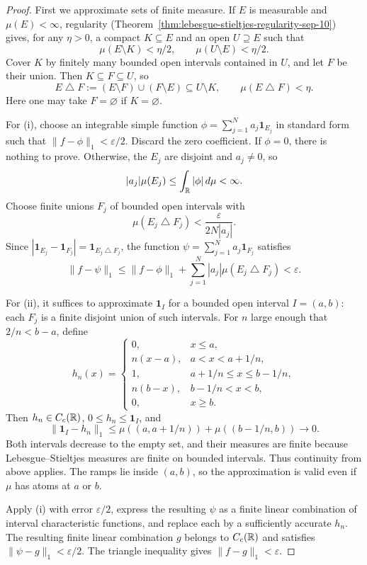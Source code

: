 \begin{proof}
  First we approximate sets of finite measure. If $E$ is measurable
  and $\mu(E)<\infty$, regularity
  (Theorem~\ref{thm:lebesgue-stieltjes-regularity-sep-10}) gives,
  for any $\eta>0$, a compact $K\subseteq E$ and an open
  $U\supseteq E$ such that
  \[
    \mu(E\setminus K)<\eta/2,\qquad
    \mu(U\setminus E)<\eta/2.
  \]
  Cover $K$ by finitely many bounded open intervals contained in
  $U$, and let $F$ be their union. Then $K\subseteq F\subseteq U$,
  so
  \[
    E\mathbin{\triangle}F
      :=(E\setminus F)\cup(F\setminus E)
      \subseteq U\setminus K,
    \qquad \mu(E\mathbin{\triangle}F)<\eta.
  \]
  Here one may take $F=\varnothing$ if $K=\varnothing$.

  For (i), choose an integrable simple function
  $\phi=\sum_{j=1}^N a_j\mathbf 1_{E_j}$ in standard form such
  that $\|f-\phi\|_1<\varepsilon/2$. Discard the zero coefficient.
  If $\phi=0$, there is nothing to prove. Otherwise, the $E_j$ are
  disjoint and $a_j\neq0$, so
  \[
    |a_j|\mu(E_j)\leq\int_{\mathbb{R}}|\phi|\,d\mu<\infty.
  \]
  Choose finite unions $F_j$ of bounded open intervals with
  \[
    \mu(E_j\mathbin{\triangle}F_j)
      <\frac{\varepsilon}{2N|a_j|}.
  \]
  Since $|\mathbf 1_{E_j}-\mathbf 1_{F_j}|
  =\mathbf 1_{E_j\mathbin{\triangle}F_j}$, the function
  $\psi=\sum_{j=1}^N a_j\mathbf 1_{F_j}$ satisfies
  \[
    \|f-\psi\|_1
      \leq\|f-\phi\|_1+
        \sum_{j=1}^N|a_j|\mu(E_j\mathbin{\triangle}F_j)
      <\varepsilon.
  \]

  For (ii), it suffices to approximate $\mathbf 1_I$ for a bounded
  open interval $I=(a,b)$: each $F_j$ is a finite disjoint union
  of such intervals. For $n$ large enough that $2/n<b-a$, define
  \[
    h_n(x)=
    \begin{cases}
      0,&x\leq a,\\
      n(x-a),&a<x<a+1/n,\\
      1,&a+1/n\leq x\leq b-1/n,\\
      n(b-x),&b-1/n<x<b,\\
      0,&x\geq b.
    \end{cases}
  \]
  Then $h_n\in C_c(\mathbb{R})$, $0\leq h_n\leq\mathbf 1_I$, and
  \[
    \|\mathbf 1_I-h_n\|_1
      \leq\mu((a,a+1/n))+\mu((b-1/n,b))\longrightarrow0.
  \]
  Both intervals decrease to the empty set, and their measures are
  finite because Lebesgue--Stieltjes measures are finite on bounded
  intervals. Thus continuity from above applies. The ramps lie
  inside $(a,b)$, so the approximation is valid even if $\mu$ has
  atoms at $a$ or $b$.

  Apply (i) with error $\varepsilon/2$, express the resulting
  $\psi$ as a finite linear combination of interval characteristic
  functions, and replace each by a sufficiently accurate $h_n$.
  The resulting finite linear combination $g$ belongs to
  $C_c(\mathbb{R})$ and satisfies $\|\psi-g\|_1<\varepsilon/2$.
  The triangle inequality gives $\|f-g\|_1<\varepsilon$.
\end{proof}

